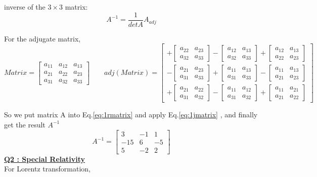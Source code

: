 \documentclass{article}
\begin{document}
inverse of the $3\times3$ matrix:\\
\begin{equation}
   A^{-1}=\frac{1}{detA}A_{adj}
   \label{eq:1rmatrix}
\end{equation}

For the adjugate matrix,
\begin{equation}
Matrix=\begin{bmatrix}a_{11}& a_{12}& a_{13} \\a_{21}& a_{22}& a_{23}\\a_{31}& a_{32}& a_{33}\end{bmatrix}
\qquad
adj(Matrix)=
\begin{bmatrix}
+\begin{bmatrix}a_{22}& a_{23}\\a_{32}& a_{33}\end{bmatrix}
-\begin{bmatrix}a_{12}& a_{13}\\a_{32}& a_{33}\end{bmatrix}
+\begin{bmatrix}a_{12}& a_{13}\\a_{22}& a_{23}\end{bmatrix}\\
-\begin{bmatrix}a_{21}& a_{23}\\a_{31}& a_{33}\end{bmatrix}
+\begin{bmatrix}a_{11}& a_{13}\\a_{31}& a_{33}\end{bmatrix}
-\begin{bmatrix}a_{11}& a_{13}\\a_{21}& a_{23}\end{bmatrix}\\
+\begin{bmatrix}a_{21}& a_{22}\\a_{31}& a_{32}\end{bmatrix}
-\begin{bmatrix}a_{11}& a_{12}\\a_{31}& a_{32}\end{bmatrix}
+\begin{bmatrix}a_{11}& a_{21}\\a_{21}& a_{22}\end{bmatrix}
\end{bmatrix}
\label{eq:1jmatrix}
\end{equation}

So we put matrix A into Eq.\ref{eq:1rmatrix} and apply Eq.\ref{eq:1jmatrix}  , and finally get the result $A^{-1}$
\[
A^{-1}=\begin{bmatrix} 3& -1& 1\\-15& 6& -5\\5& -2& 2\end{bmatrix}
\]
\underline{\textbf{Q2 : Special Relativity}}\\
For Lorentz transformation,
\end{document}
